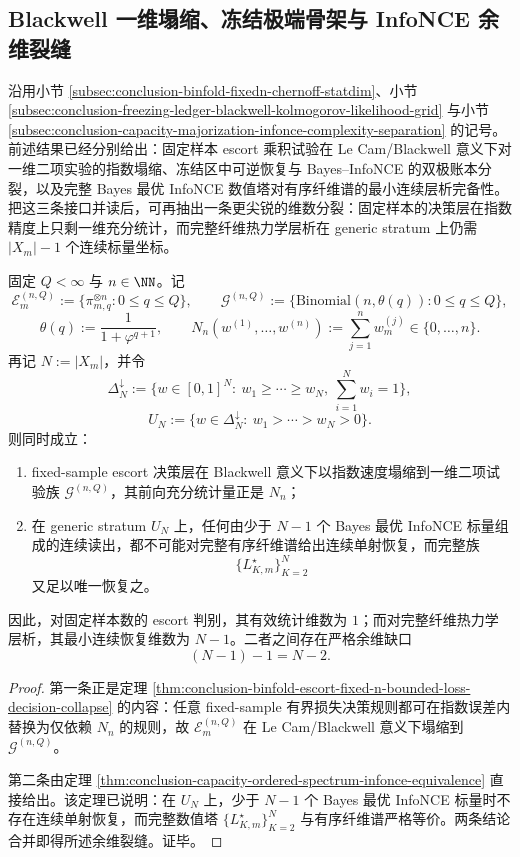 \subsection{Blackwell 一维塌缩、冻结极端骨架与 InfoNCE 余维裂缝}\label{subsec:conclusion-blackwell-freezing-infonce-codimension-fracture}

沿用小节 \ref{subsec:conclusion-binfold-fixedn-chernoff-statdim}、小节 \ref{subsec:conclusion-freezing-ledger-blackwell-kolmogorov-likelihood-grid} 与小节 \ref{subsec:conclusion-capacity-majorization-infonce-complexity-separation} 的记号。前述结果已经分别给出：固定样本 escort 乘积试验在 Le Cam/Blackwell 意义下对一维二项实验的指数塌缩、冻结区中可逆恢复与 Bayes--InfoNCE 的双极账本分裂，以及完整 Bayes 最优 InfoNCE 数值塔对有序纤维谱的最小连续层析完备性。把这三条接口并读后，可再抽出一条更尖锐的维数分裂：固定样本的决策层在指数精度上只剩一维充分统计，而完整纤维热力学层析在 generic stratum 上仍需 \(|X_m|-1\) 个连续标量坐标。

\begin{theorem}\label{thm:conclusion-escort-decision-thermal-codimension-gap}
固定 \(Q<\infty\) 与 \(n\in\NN\)。记
\[
\mathcal E_m^{(n,Q)}:=\{\pi_{m,q}^{\otimes n}:0\le q\le Q\},
\qquad
\mathcal G^{(n,Q)}:=\{\mathrm{Binomial}(n,\theta(q)):0\le q\le Q\},
\]
\[
\theta(q):=\frac{1}{1+\varphi^{q+1}},
\qquad
N_n(w^{(1)},\dots,w^{(n)}):=\sum_{j=1}^n w_m^{(j)}\in\{0,\dots,n\}.
\]
再记 \(N:=|X_m|\)，并令
\[
\Delta_N^\downarrow:=\bigl\{w\in[0,1]^N:\ w_1\ge\cdots\ge w_N,\ \sum_{i=1}^{N}w_i=1\bigr\},
\]
\[
U_N:=\bigl\{w\in\Delta_N^\downarrow:\ w_1>\cdots>w_N>0\bigr\}.
\]
则同时成立：
\begin{enumerate}
  \item fixed-sample escort 决策层在 Blackwell 意义下以指数速度塌缩到一维二项试验族 \(\mathcal G^{(n,Q)}\)，其前向充分统计量正是 \(N_n\)；
  \item 在 generic stratum \(U_N\) 上，任何由少于 \(N-1\) 个 Bayes 最优 InfoNCE 标量组成的连续读出，都不可能对完整有序纤维谱给出连续单射恢复，而完整族
  \[
  \{L_{K,m}^{\star}\}_{K=2}^{N}
  \]
  又足以唯一恢复之。
\end{enumerate}
因此，对固定样本数的 escort 判别，其有效统计维数为 \(1\)；而对完整纤维热力学层析，其最小连续恢复维数为 \(N-1\)。二者之间存在严格余维缺口
\[
(N-1)-1=N-2.
\]
\end{theorem}
\begin{proof}
第一条正是定理 \ref{thm:conclusion-binfold-escort-fixed-n-bounded-loss-decision-collapse} 的内容：任意 fixed-sample 有界损失决策规则都可在指数误差内替换为仅依赖 \(N_n\) 的规则，故 \(\mathcal E_m^{(n,Q)}\) 在 Le Cam/Blackwell 意义下塌缩到 \(\mathcal G^{(n,Q)}\)。

第二条由定理 \ref{thm:conclusion-capacity-ordered-spectrum-infonce-equivalence} 直接给出。该定理已说明：在 \(U_N\) 上，少于 \(N-1\) 个 Bayes 最优 InfoNCE 标量时不存在连续单射恢复，而完整数值塔 \(\{L_{K,m}^{\star}\}_{K=2}^{N}\) 与有序纤维谱严格等价。两条结论合并即得所述余维裂缝。证毕。
\end{proof}

